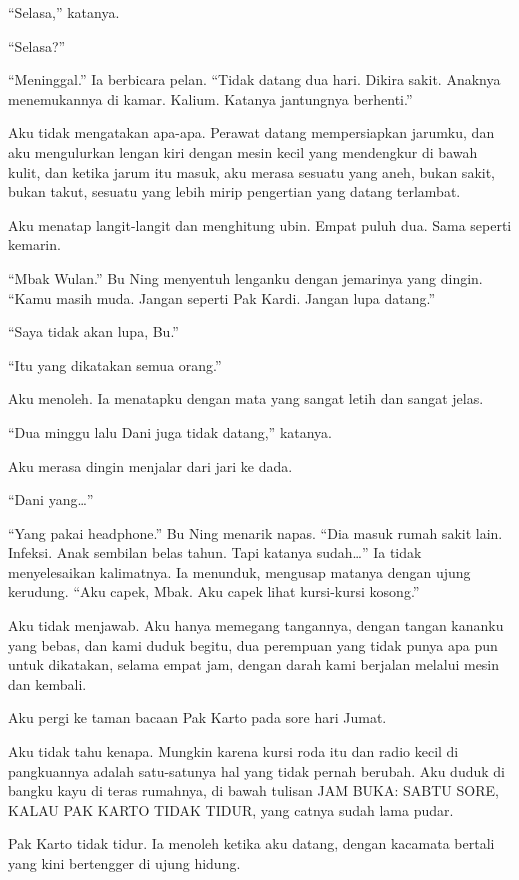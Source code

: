 \documentclass[11pt,twoside,openany]{book}
\makeatletter
\newcommand{\scenebreak}{\par\vspace{0.9em}{\centering\textsc{*\hspace{0.7em}*\hspace{0.7em}*}\par}\vspace{0.9em}\@afterindentfalse\@afterheading}
\makeatother
\begin{document}
``Selasa,'' katanya.

``Selasa?''

``Meninggal.'' Ia berbicara pelan. ``Tidak datang dua hari. Dikira sakit. Anaknya menemukannya di kamar. Kalium. Katanya jantungnya berhenti.''

Aku tidak mengatakan apa-apa. Perawat datang mempersiapkan jarumku, dan aku mengulurkan lengan kiri dengan mesin kecil yang mendengkur di bawah kulit, dan ketika jarum itu masuk, aku merasa sesuatu yang aneh, bukan sakit, bukan takut, sesuatu yang lebih mirip pengertian yang datang terlambat.

Aku menatap langit-langit dan menghitung ubin. Empat puluh dua. Sama seperti kemarin.

``Mbak Wulan.'' Bu Ning menyentuh lenganku dengan jemarinya yang dingin. ``Kamu masih muda. Jangan seperti Pak Kardi. Jangan lupa datang.''

``Saya tidak akan lupa, Bu.''

``Itu yang dikatakan semua orang.''

Aku menoleh. Ia menatapku dengan mata yang sangat letih dan sangat jelas.

``Dua minggu lalu Dani juga tidak datang,'' katanya.

Aku merasa dingin menjalar dari jari ke dada.

``Dani yang\ldots{}''

``Yang pakai headphone.'' Bu Ning menarik napas. ``Dia masuk rumah sakit lain. Infeksi. Anak sembilan belas tahun. Tapi katanya sudah\ldots{}'' Ia tidak menyelesaikan kalimatnya. Ia menunduk, mengusap matanya dengan ujung kerudung. ``Aku capek, Mbak. Aku capek lihat kursi-kursi kosong.''

Aku tidak menjawab. Aku hanya memegang tangannya, dengan tangan kananku yang bebas, dan kami duduk begitu, dua perempuan yang tidak punya apa pun untuk dikatakan, selama empat jam, dengan darah kami berjalan melalui mesin dan kembali.

\scenebreak
Aku pergi ke taman bacaan Pak Karto pada sore hari Jumat.

Aku tidak tahu kenapa. Mungkin karena kursi roda itu dan radio kecil di pangkuannya adalah satu-satunya hal yang tidak pernah berubah. Aku duduk di bangku kayu di teras rumahnya, di bawah tulisan JAM BUKA: SABTU SORE, KALAU PAK KARTO TIDAK TIDUR, yang catnya sudah lama pudar.

Pak Karto tidak tidur. Ia menoleh ketika aku datang, dengan kacamata bertali yang kini bertengger di ujung hidung.
\end{document}
